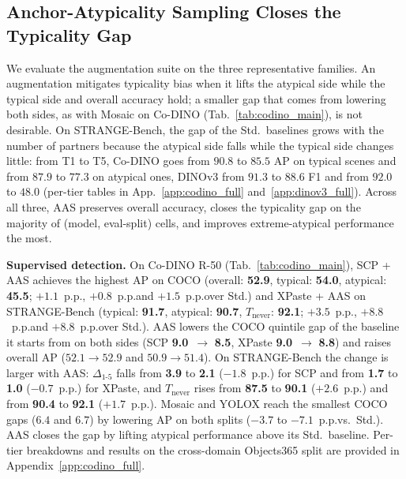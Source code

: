 \subsection{Anchor-Atypicality Sampling Closes the Typicality Gap}
\label{sec:results_mitigation}

We evaluate the augmentation suite on the three representative families. An augmentation mitigates typicality bias when it lifts the atypical side while the typical side and overall accuracy hold; a smaller gap that comes from lowering both sides, as with Mosaic on Co-DINO (Tab.~\ref{tab:codino_main}), is not desirable. On STRANGE-Bench, the gap of the Std.\ baselines grows with the number of partners because the atypical side falls while the typical side changes little: from T1 to T5, Co-DINO goes from $90.8$ to $85.5$ AP on typical scenes and from $87.9$ to $77.3$ on atypical ones, DINOv3 from $91.3$ to $88.6$ F1 and from $92.0$ to $48.0$ (per-tier tables in App.~\ref{app:codino_full} and~\ref{app:dinov3_full}). Across all three, AAS preserves overall accuracy, closes
the typicality gap on the majority of (model, eval-split) cells, and
improves extreme-atypical performance the most.



\noindent\textbf{Supervised detection.}
On Co-DINO R-50 (Tab.~\ref{tab:codino_main}), SCP + AAS achieves the highest AP on COCO (overall: \textbf{52.9}, typical: \textbf{54.0}, atypical: \textbf{45.5}; $+1.1$~p.p.\@, $+0.8$~p.p.\@ and $+1.5$~p.p.\@ over Std.) and XPaste + AAS on STRANGE-Bench (typical: \textbf{91.7}, atypical: \textbf{90.7}, $T_{\text{never}}$: \textbf{92.1}; $+3.5$~p.p.\@, $+8.8$~p.p.\@ and $+8.8$~p.p.\@ over Std.). AAS lowers the COCO quintile gap of the baseline it starts from on
both sides (SCP \textbf{9.0}~$\rightarrow$ \textbf{8.5}, XPaste \textbf{9.0}~$\rightarrow$ \textbf{8.8}) and raises overall AP
($52.1 \rightarrow 52.9$ and $50.9 \rightarrow 51.4$). On STRANGE-Bench the change is larger with AAS:
$\Delta_{1\text{-}5}$ falls from \textbf{3.9} to \textbf{2.1} ($-1.8$~p.p.\@) for SCP and from \textbf{1.7} to \textbf{1.0} ($-0.7$~p.p.\@) for XPaste, and
$T_{\text{never}}$ rises from \textbf{87.5} to \textbf{90.1} ($+2.6$~p.p.\@) and from \textbf{90.4} to \textbf{92.1} ($+1.7$~p.p.\@).
Mosaic and YOLOX reach the smallest COCO gaps ($6.4$ and $6.7$) by lowering AP on both splits
($-3.7$ to $-7.1$~p.p.\@ vs.\ Std.). AAS closes the
gap by lifting atypical performance above its Std.\ baseline. Per-tier
breakdowns and results on the cross-domain Objects365 split are provided in Appendix~\ref{app:codino_full}.


